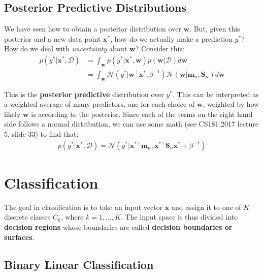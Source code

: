 \documentclass[12pt,letterpaper]{article}
\begin{document}
\subsection{Posterior Predictive Distributions}

We have seen how to obtain a posterior distribution over $\mathbf{w}$. But, given this posterior and a new data point $\mathbf{x}^{*}$,
how do we actually make a prediction $y^{*}$? How do we deal with \textit{uncertainty} about $\mathbf{w}$? Consider this:
\begin{align}
p(y^{*}| \mathbf{x}^{*}, \mathcal{D}) &= \int_{\mathbf{w}} p(y^{*}|\mathbf{x}^{*}, \mathbf{w})p(\mathbf{w} | \mathcal{D}) d\mathbf{w}\\
&= \int_{\mathbf{w}} \mathcal{N}(y^{*}|\mathbf{w}^\top\mathbf{x}^{*}, \beta^{-1}) \mathcal{N}(\mathbf{w}|\mathbf{m}_n, \mathbf{S}_n) d\mathbf{w} 
\end{align}

\noindent This is the \textbf{posterior predictive} distribution over $y^{*}$. This can be interpreted as a weighted average of many predictors, 
one for each choice of $\mathbf{w}$, weighted by how likely $\mathbf{w}$ is according to the posterior. Since each of the terms on the right hand side 
follows a normal distribution, we can use some math (see CS181 2017 lecture 5, slide 33) to find that:
\begin{align}
p(y^{*}| \mathbf{x}^{*}, \mathcal{D}) = \mathcal{N}(y^{*}| \mathbf{x}^{*\top}\mathbf{m}_n, \mathbf{x}^{*\top}\mathbf{S}_n\mathbf{x}^{*} + \beta^{-1})
\end{align}

\section{Classification}
The goal in classification is to take an input vector $\mathbf{x}$ and assign it to one of $K$ discrete classes $C_k$, where $k = 1, \hdots, K$.
The input space is thus divided into \textbf{decision regions} whose boundaries are called \textbf{decision boundaries or surfaces}.

\subsection{Binary Linear Classification}
\end{document}

